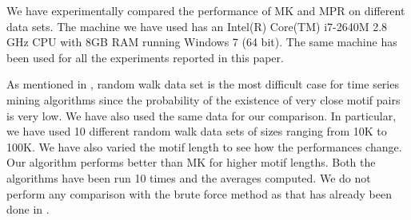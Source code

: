 \documentclass{article}
\theoremstyle{definition}
\theoremstyle{remark}
\begin{document}
We have experimentally compared the performance of MK and MPR on different data sets. The machine we have used has an
Intel(R) Core(TM) i7-2640M 2.8 GHz CPU with 8GB RAM running Windows 7 (64 bit). The same machine has been used for all the experiments reported in this paper.

As mentioned in \cite{AEQSB09}, random walk data set is the most difficult case for time series mining algorithms since the probability of the existence of very close motif pairs is very low.
We have also used the same data for our comparison.
In particular, we have used 10 different random walk data sets of sizes ranging from 10K to 100K. We have also varied the motif length to see how the performances change. Our algorithm performs better than MK for higher motif lengths. Both the algorithms have been run 10 times and the averages computed. We do not perform any comparison with the brute force  method as that has already been done in \cite{AEQSB09}.\newline

\begin{table}[ht]
\centering  {}
\vspace*{0.2in}
\caption{Number of Pairs and Runtime comparison: Euclidean case}\label{table1} \end{table}
\end{document}
